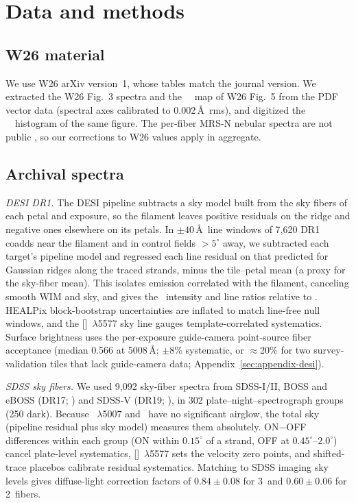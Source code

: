 \section{Data and methods}\label{sec:data}

\subsection{W26 material}

We use W26 arXiv version~1, whose tables match the journal version. We extracted the W26 Fig.~3 spectra and the \Ha\ \vlsr\ map of W26 Fig.~5 from the PDF vector data (spectral axes calibrated to 0.002\,\AA\ rms), and digitized the \Oiii\ \vlsr\ histogram of the same figure. The per-fiber MRS-N nebular spectra are not public \citep{Zhang2025}, so our corrections to W26 values apply in aggregate.

\subsection{Archival spectra}

\emph{DESI DR1.} The DESI pipeline \citep{Guy2023} subtracts a sky model built from the sky fibers of each petal and exposure, so the filament leaves positive residuals on the ridge and negative ones elsewhere on its petals. In $\pm40$\,\AA\ line windows of 7,620 DR1 coadds \citep{DESI2026} near the filament and in control fields $>5^\circ$ away, we subtracted each target's pipeline model and regressed each line residual on that predicted for Gaussian ridges along the traced strands, minus the tile--petal mean (a proxy for the sky-fiber mean). This isolates emission correlated with the filament, canceling smooth WIM and sky, and gives the \Oiii\ intensity and line ratios relative to \Oiii. HEALPix block-bootstrap uncertainties are inflated to match line-free null windows, and the []~$\lambda$5577 sky line gauges template-correlated systematics. Surface brightness uses the per-exposure guide-camera point-source fiber acceptance (median 0.566 at 5008\,\AA; $\pm8\%$ systematic, or $\approx$20\% for two survey-validation tiles that lack guide-camera data; Appendix~\ref{sec:appendix-desi}).

\emph{SDSS sky fibers.} We used 9,092 sky-fiber spectra from SDSS-I/II, BOSS and eBOSS (DR17; \citealt{Abdurrouf2022}) and SDSS-V (DR19; \citealt{SDSS2026}), in 302 plate--night--spectrograph groups (250 dark). Because \Oiii~$\lambda$5007 and \Hb\ have no significant airglow, the total sky (pipeline residual plus sky model) measures them absolutely. ON$-$OFF differences within each group (ON within $0.15^\circ$ of a strand, OFF at $0.45^\circ$--$2.0^\circ$) cancel plate-level systematics, []~$\lambda$5577 sets the velocity zero points, and shifted-trace placebos calibrate residual systematics. Matching to SDSS imaging sky levels \citep{Almeida2023} gives diffuse-light correction factors of $0.84\pm0.08$ for 3\arcsec\ and $0.60\pm0.06$ for 2\arcsec\ fibers.

